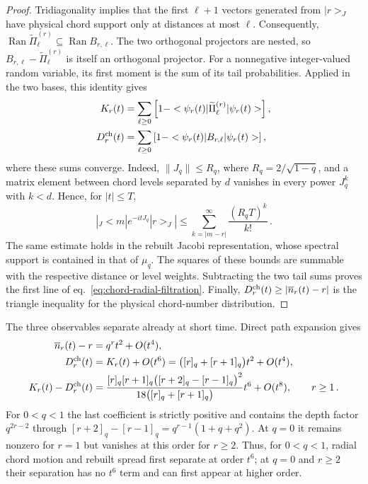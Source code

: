 \documentclass[a4paper,11pt]{article}
\def\ket#1{|#1>}%
\def\bra#1{<#1|}%
\def\ii{i}%
\def\ee{e}%
\def\Jac{J}%
\theoremstyle{definition}
\theoremstyle{remark}
\newcommand{\ket}[1]{|#1\rangle}
\newcommand{\bra}[1]{\langle #1|}
\newcommand{\ii}{\mathrm i}
\newcommand{\ee}{\mathrm e}
\newcommand{\Jac}{\mathsf J}
\begin{document}
\begin{proof}
Tridiagonality implies that the first $\ell+1$ vectors generated from
$\ket r_{\Jac}$ have physical chord support only at distances at most $\ell$.
Consequently,
$\operatorname{Ran}\widetilde\Pi_{\ell}^{(r)}\subseteq
\operatorname{Ran}B_{r,\ell}$.  The two orthogonal projectors are nested, so
$B_{r,\ell}-\widetilde\Pi_{\ell}^{(r)}$ is itself an orthogonal projector.
For a nonnegative integer-valued random variable, its first moment is the sum of its
tail probabilities.  Applied in the two bases, this identity gives
\begin{equation}
\begin{aligned}
 K_r(t)&=\sum_{\ell\ge0}
 \left[1-\bra{\psi_r(t)}\widetilde\Pi_{\ell}^{(r)}\ket{\psi_r(t)}\right],\\
 D_r^{\rm ch}(t)&=\sum_{\ell\ge0}
 \left[1-\bra{\psi_r(t)}B_{r,\ell}\ket{\psi_r(t)}\right],
\end{aligned}
\end{equation}
where these sums converge.  Indeed,
$\|\Jac_q\|\le R_q$, where $R_q=2/\sqrt{1-q}$, and a matrix element between chord
levels separated by $d$ vanishes in every power $\Jac_q^k$ with $k<d$.
Hence, for $|t|\le T$,
\begin{equation}
 \left|{}_{\Jac}\!\bra m\ee^{-\ii t\Jac_q}\ket r_{\Jac}\right|
 \le \sum_{k=|m-r|}^{\infty}\frac{(R_qT)^k}{k!}\,.
\end{equation}
The same estimate holds in the rebuilt Jacobi representation, whose spectral support is
contained in that of $\mu_q$.  The squares of these bounds are summable with the respective
distance or level weights.  Subtracting the two tail sums proves the first line of
eq.~\eqref{eq:chord-radial-filtration}.  Finally,
$D_r^{\rm ch}(t)\ge|\overline n_r(t)-r|$ is the triangle inequality for the
physical chord-number distribution.
\end{proof}

The three observables separate already at short time.  Direct path expansion gives
\begin{equation}
\begin{aligned}
   \overline n_r(t)-r
   &=q^rt^2+O(t^4),\\
   D_r^{\rm ch}(t)
   &=K_r(t)+O(t^6)
    =\bigl([r]_q+[r+1]_q\bigr)t^2+O(t^4),\\
   K_r(t)-D_r^{\rm ch}(t)
   &=\frac{[r]_q[r+1]_q\bigl([r+2]_q-[r-1]_q\bigr)^2}
      {18\bigl([r]_q+[r+1]_q\bigr)}t^6+O(t^8),
   \qquad r\ge1\,.
   \label{eq:chord-two-basis-short-time}
\end{aligned}
\end{equation}
For $0<q<1$ the last coefficient is strictly positive and contains the depth factor
$q^{2r-2}$ through
$[r+2]_q-[r-1]_q=q^{r-1}(1+q+q^2)$.  At $q=0$ it remains nonzero for $r=1$ but vanishes at
this order for $r\ge2$.  Thus, for $0<q<1$, radial chord motion and rebuilt spread first separate
at order $t^6$; at $q=0$ and $r\ge2$ their separation
has no $t^6$ term and can first appear at higher order.
\end{document}
